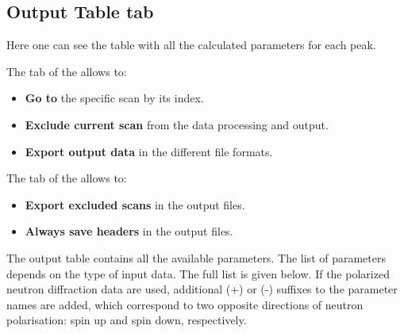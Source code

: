 \newpage
\subsection{Output Table tab}

Here one can see the table with all the calculated parameters for each peak.


The  tab of the  allows to:

\begin{itemize}
	\item \textbf{Go to} the specific scan by its index.
	\item \textbf{Exclude current scan} from the data processing and output.
	\item \textbf{Export output data} in the different file formats.
\end{itemize}
 
The  tab of the  allows to:

\begin{itemize}
	\item \textbf{Export excluded scans} in the output files.
	\item \textbf{Always save headers} in the output files.
\end{itemize}

\newpage
The output table contains all the available parameters. The list of parameters depends on the type of input data. The full list is given below. If the polarized neutron diffraction data are used, additional (+) or (-) suffixes to the parameter names are added, which correspond to two opposite directions of neutron polarisation: spin up and spin down, respectively.
 
